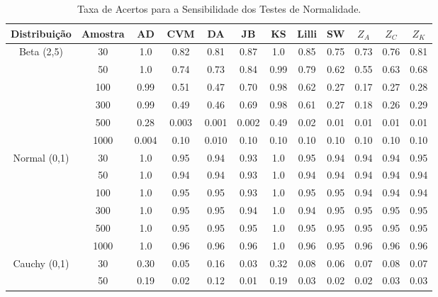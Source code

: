 \documentclass[final]{beamer}
\begin{document}
\begin{frame}[t]
\begin{columns}[t,totalwidth=0.6\paperwidth]
\begin{column}{0.45\paperwidth}
\begin{table}[H]
    \centering
    \caption{Taxa de Acertos para a Sensibilidade dos Testes de Normalidade.}
    \begin{tabular}{c|c|c|c|c|c|c|c|c|c|c|c}
    \hline \hline
Distribuição              & Amostra &   AD  & CVM  &  DA   & JB   &  KS   & Lilli &  SW  & $Z_{A}$ & $Z_{C}$ & $Z_{K}$ \\
    \hline
\multirow{6}{*}{Beta (2,5)} 
                & 30    & 1.0   & 0.82 & 0.81  & 0.87 &  1.0  &  0.85  &  0.75 &  0.73  & 0.76   & 0.81   \\
                & 50    & 1.0   & 0.74 & 0.73  & 0.84 &  0.99 &  0.79  &  0.62 &  0.55  & 0.63   & 0.68   \\
                & 100   & 0.99  & 0.51 & 0.47  & 0.70 &  0.98 &  0.62  &  0.27 &  0.17  & 0.27   & 0.28   \\
                & 300   & 0.99  & 0.49 & 0.46  & 0.69 &  0.98 &  0.61  &  0.27 &  0.18  & 0.26   & 0.29    \\
                & 500   & 0.28  & 0.003 & 0.001  & 0.002 & 0.49  & 0.02 & 0.01  & 0.01  & 0.01   & 0.01     \\
                & 1000  & 0.004  & 0.10  & 0.010  & 0.10 & 0.10  & 0.10  & 0.10  & 0.10  & 0.10  & 0.10       \\
\hline\hline
\multirow{6}{*}{Normal (0,1)}   
               & 30     & 1.0   & 0.95  &  0.94 & 0.93 &  1.0  &  0.95  & 0.94  &  0.94  &  0.94  & 0.95   \\
               &  50    & 1.0   & 0.94  &  0.94 & 0.93 &  1.0  &  0.94  & 0.94  &  0.94  &  0.94  & 0.94    \\
               & 100    & 1.0   & 0.95  &  0.95 & 0.93 &  1.0  &  0.95  & 0.95  &  0.94  &  0.94  & 0.94   \\
               & 300    & 1.0   & 0.95  &  0.95 & 0.94 &  1.0  &  0.94  & 0.95  &  0.95  &  0.95  & 0.95    \\
               & 500    & 1.0   & 0.95  &  0.95 & 0.95 &  1.0  &  0.95  & 0.95  &  0.95  &  0.95  & 0.95    \\
               & 1000   & 1.0   & 0.96  &  0.96 & 0.96 &  1.0  &  0.96  & 0.95  &  0.96  &  0.96  & 0.96     \\  
\hline\hline
\multirow{6}{*}{Cauchy (0,1)}     
               & 30     &  0.30 & 0.05  &  0.16 & 0.03  & 0.32  & 0.08  & 0.06  & 0.07   & 0.08   & 0.07   \\
               & 50     &  0.19 & 0.02  &  0.12 & 0.01  & 0.19  & 0.03  & 0.02  & 0.02   & 0.03   & 0.03    \\

\end{tabular}
\end{table}
\end{column}
\end{columns}
\end{frame}
\end{document}
